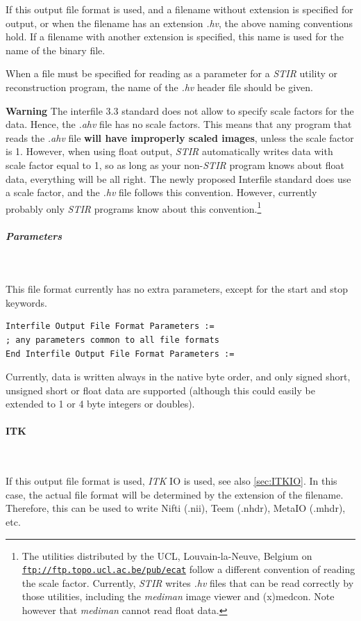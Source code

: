 \documentclass{article}
\def\url#1#2{\mbox{\href{#1}{\tt #2}}}
\newcommand{\subsubsubsection}[1]{\paragraph{#1}\mbox{} \\}
\newcommand{\subsubsubsubsection}[1]{\subparagraph{#1} \mbox{} \\}
\begin{document}
{{If this output file format is used, and a filename without extension 
is specified for output, or when the filename has an extension \textit{.hv}, 
the above naming conventions hold. If a filename with another 
extension is specified, this name is used for the name of the 
binary file. 


When a file must be specified for reading as a parameter for 
a \textit{STIR} utility or reconstruction program, the name of the \textit{.hv} 
header file should be given. 



\textbf{Warning} The interfile 3.3 standard does not allow to specify 
scale factors for the data. Hence, the \textit{.ahv} file has no scale 
factors. This means that any program that reads the \textit{.ahv} 
file \textbf{will have improperly scaled images}, unless the scale 
factor is 1. However, when using float output, \textit{STIR} automatically 
writes data with scale factor equal to 1, so as long as your 
non-\textit{STIR} program knows about float data, everything will 
be all right. The newly proposed Interfile standard does use 
a scale factor, and the \textit{.hv} file follows this convention. 
However, currently probably only \textit{STIR} programs know about 
this convention.\footnote{{\small The utilities distributed by the UCL, 
Louvain-la-Neuve, Belgium on \url{ftp://ftp.topo.ucl.ac.be/pub/ecat }{ftp://ftp.topo.ucl.ac.be/pub/ecat} 
follow a different convention of reading the scale factor. Currently, \textit{STIR} 
writes \textit{.hv} files that can be read correctly by those utilities, 
including the \textit{mediman} image viewer and (x)medcon. Note however 
that \textit{mediman} cannot read float data.}}

{ \subsubsubsubsection{Parameters}
}
This file format currently has no extra parameters, except for 
the start and stop keywords.

\begin{verbatim}
Interfile Output File Format Parameters :=
; any parameters common to all file formats
End Interfile Output File Format Parameters :=
\end{verbatim}

Currently, data is written always in the native byte order, and 
only signed short, unsigned short or float data are supported 
(although this could easily be extended to 1 or 4 byte integers 
or doubles).

{ \subsubsubsection{ITK}
}
If this output file format is used, \textit{ITK} IO is used, see also \ref{sec:ITKIO}. 
In this case, the actual file format will be determined by the extension of the filename.
Therefore, this can be used to write Nifti (.nii), Teem (.nhdr),
MetaIO (.mhdr), etc.

}}
\end{document}
